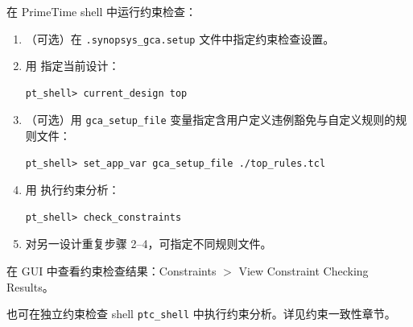 在 PrimeTime shell 中运行约束检查：
\begin{enumerate}
  \item（可选）在 \texttt{.synopsys\_gca.setup} 文件中指定约束检查设置。
  \item 用  指定当前设计：
\begin{lstlisting}
pt_shell> current_design top
\end{lstlisting}
  \item（可选）用 \texttt{gca\_setup\_file} 变量指定含用户定义违例豁免与自定义规则的规则文件：
\begin{lstlisting}
pt_shell> set_app_var gca_setup_file ./top_rules.tcl
\end{lstlisting}
  \item 用  执行约束分析：
\begin{lstlisting}
pt_shell> check_constraints
\end{lstlisting}
  \item 对另一设计重复步骤 2--4，可指定不同规则文件。
\end{enumerate}

在 GUI 中查看约束检查结果：Constraints $>$ View Constraint Checking Results。


也可在独立约束检查 shell \texttt{ptc\_shell} 中执行约束分析。详见约束一致性章节。

